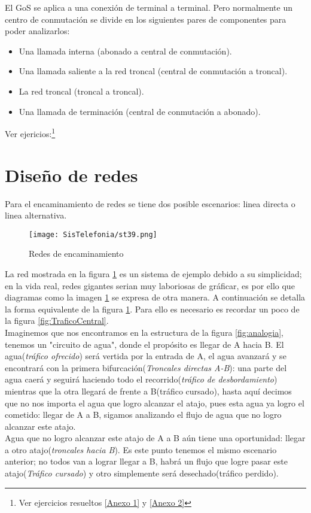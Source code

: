 \documentclass[
	11pt, %
	fleqn, %
	a4paper, %
]{LegrandOrangeBook}
\begin{document}
El GoS se aplica a una conexión de terminal a terminal. Pero normalmente un centro de conmutación se divide en los siguientes pares de componentes para poder analizarlos:
\begin{itemize}
\item Una llamada interna (abonado a central de conmutación).
\item Una llamada saliente a la red troncal (central de conmutación a troncal).
\item La red troncal (troncal a troncal).
\item Una llamada de terminación (central de conmutación a abonado).
\end{itemize}
Ver ejericios:\footnote{Ver ejercicios resueltos \ref{Anexo 1} y \ref{Anexo 2}}
\section{Diseño de redes}
Para el encaminamiento de redes se tiene dos posible escenarios: linea directa o linea alternativa.
\begin{figure}[ht]
\centering\texttt{[image: SisTelefonia/st39.png]}
\caption{Redes de encaminamiento}
\label{fig:Rutas}
\end{figure}
La red mostrada en la figura \ref{fig:Rutas} es un sistema de ejemplo debido a su simplicidad; en la vida real, redes gigantes serian muy laboriosas de gráficar, es por ello que diagramas como la imagen \ref{fig:Rutas} se expresa de otra manera. A continuación se detalla la forma equivalente de la figura \ref{fig:Rutas}. Para ello es necesario es recordar un poco de la figura \ref{fig:TraficoCentral}.\\
Imaginemos que nos encontramos en la estructura de la figura \ref{fig:analogia}, tenemos un "circuito de agua", donde el propósito es llegar de A hacia B. El agua(\textit{tráfico ofrecido}) será vertida por la entrada de A, el agua avanzará y se encontrará con la primera bifurcación(\textit{Troncales directas A-B}): una parte del agua caerá y seguirá haciendo todo el recorrido(\textit{tráfico de desbordamiento}) mientras que la otra llegará de frente a B(tráfico cursado), hasta aquí decimos que no nos importa el agua que logro alcanzar el atajo, pues esta agua ya logro el cometido: llegar de A a B, sigamos analizando el flujo de agua que no logro alcanzar este atajo.\\
Agua que no logro alcanzar este atajo de A a B aún tiene una oportunidad: llegar a otro atajo(\textit{troncales hacia B}). Es este punto tenemos el mismo escenario anterior; no todos van a lograr llegar a B, habrá un flujo que logre pasar este atajo(\textit{Tráfico cursado}) y otro simplemente será desechado(tráfico perdido).\\
\end{document}
